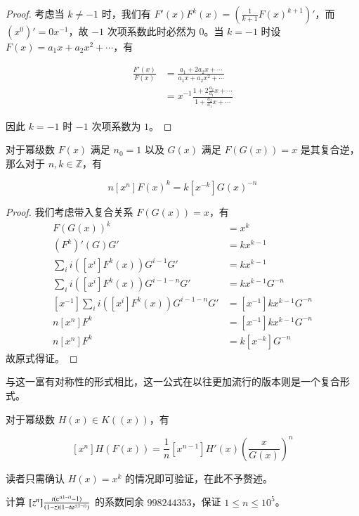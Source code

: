 \begin{proof} 考虑当 $k\neq -1$ 时，我们有 $F'(x)F^k(x)=(\frac 1{k+1} F(x)^{k+1})'$，而 $(x^0)'=0x^{-1}$，故 $-1$ 次项系数此时必然为 $0$。当 $k=-1$ 时设 $F(x) = a_1 x + a_2 x^2 + \cdots$，有

\begin{align*}
\frac{F'(x)}{F(x)} &= \frac{a_1 + 2a_2x + \cdots}{a_1 x + a_2 x^2 + \cdots}\\
&= x^{-1} \frac{1 + 2\frac{a_2}{a_1} x + \cdots}{1 + \frac{a_2}{a_1} x + \cdots}
\end{align*}

因此 $k=-1$ 时 $-1$ 次项系数为 $1$。
\end{proof}
\begin{theorem}[Lagrange 反演]
对于幂级数 $F(x)$ 满足 $n_0 = 1$ 以及 $G(x)$ 满足 $F(G(x))=x$ 是其复合逆，那么对于 $n,k\in \mathbb Z$，有

$$
n[x^n]F(x)^k = k[x^{-k}]G(x)^{-n}
$$
\end{theorem}

\begin{proof}
我们考虑带入复合关系 $F(G(x))=x$，有
\begin{align*}
F(G(x))^k &= x^k\\
(F^k)'(G)G' &= kx^{k-1}\\
\sum_{i} i([x^i] F^k(x)) G^{i-1}G' &= kx^{k-1}\\
\sum_{i} i([x^i] F^k(x)) G^{i-1-n}G' &= kx^{k-1}G^{-n}\\ 
[x^{-1}]\sum_{i} i([x^i] F^k(x)) G^{i-1-n}G' &= [x^{-1}]kx^{k-1}G^{-n}\\ 
n[x^n] F^k &= [x^{-1}]kx^{k-1}G^{-n}\\ 
n[x^n] F^k &= k[x^{-k}]G^{-n}
\end{align*}
故原式得证。
\end{proof}

与这一富有对称性的形式相比，这一公式在以往更加流行的版本则是一个复合形式。

\begin{lemma}
对于幂级数 $H(x) \in K((x))$，有

$$
[x^n]H(F(x)) = \frac 1n [x^{n-1}] H'(x) \left(\frac x{G(x)}\right)^n
$$
\end{lemma}

读者只需确认 $H(x) = x^k$ 的情况即可验证，在此不予赘述。

\begin{problem}
计算 $[z^n]\frac{t(\mathrm{e}^{z(1-t)}-1)}{(1-z)(1-t\mathrm{e}^{z(1-t)})}$ 的系数同余 $998244353$，保证 $1\le n\le 10^5$。
\end{problem}

